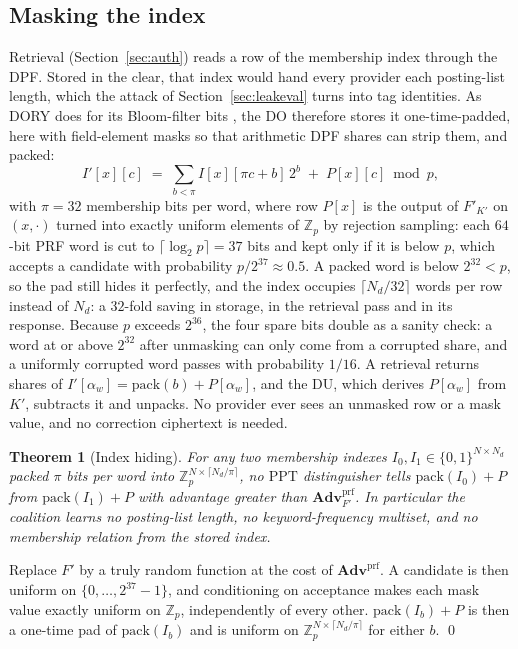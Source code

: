 \documentclass[a4paper,fleqn]{cas-sc}
\newtheorem{theorem}{Theorem}
\newcommand{\PPT}{\mathrm{PPT}}
\newcommand{\advPRF}{\mathbf{Adv}^{\mathrm{prf}}}
\begin{document}
\subsection{Masking the index}
\label{sec:mask}
Retrieval (Section~\ref{sec:auth}) reads a row of the membership index through
the DPF. Stored in the clear, that index would hand every provider each
posting-list length, which the attack of Section~\ref{sec:leakeval} turns into
tag identities. As DORY does for its Bloom-filter bits \citep[\S4.1]{dory},
the DO therefore stores it one-time-padded, here with field-element masks so
that arithmetic DPF shares can strip them, and packed:
\[
I'[x][c]\;=\;\sum_{b<\pi} I[x][\pi c+b]\,2^b \;+\; P[x][c] \bmod p ,
\]
with $\pi=32$ membership bits per word, where row $P[x]$ is the output of
$F'_{K'}$ on $(x,\cdot)$ turned into exactly uniform elements of
$\mathbb{Z}_p$ by rejection sampling: each $64$-bit PRF word is cut to
$\lceil\log_2 p\rceil=37$ bits and kept only if it is below $p$, which accepts
a candidate with probability $p/2^{37}\approx0.5$. A packed word is below
$2^{32}<p$, so the pad still hides it perfectly, and the index occupies
$\lceil N_d/32\rceil$ words per row instead of $N_d$: a $32$-fold saving in
storage, in the retrieval pass and in its response. Because $p$ exceeds $2^{36}$,
the four spare bits double as a sanity check: a word at or above $2^{32}$ after
unmasking can only come from a corrupted share, and a uniformly corrupted word
passes with probability $1/16$. A retrieval returns shares of
$I'[\alpha_w]=\mathrm{pack}(b)+P[\alpha_w]$, and the DU, which derives
$P[\alpha_w]$ from $K'$, subtracts it and unpacks. No provider ever sees an
unmasked row or a mask value, and no correction ciphertext is needed.

\begin{theorem}[Index hiding]
\label{thm:mask}
For any two membership indexes $I_0,I_1\in\{0,1\}^{N\times N_d}$ packed $\pi$ bits per word into $\mathbb{Z}_p^{N\times\lceil N_d/\pi\rceil}$, no $\PPT$
distinguisher tells $\mathrm{pack}(I_0)+P$ from $\mathrm{pack}(I_1)+P$ with advantage greater than
$\advPRF_{F'}$. In particular the coalition learns no posting-list length, no
keyword-frequency multiset, and no membership relation from the stored index.
\end{theorem}
\begin{pf}
Replace $F'$ by a truly random function at the cost of $\advPRF$. A candidate
is then uniform on $\{0,\dots,2^{37}-1\}$, and conditioning on acceptance makes
each mask value exactly uniform on $\mathbb{Z}_p$, independently of every
other. $\mathrm{pack}(I_b)+P$ is then a one-time pad of $\mathrm{pack}(I_b)$ and is uniform on
$\mathbb{Z}_p^{N\times\lceil N_d/\pi\rceil}$ for either $b$. \qed
\end{pf}
\end{document}
